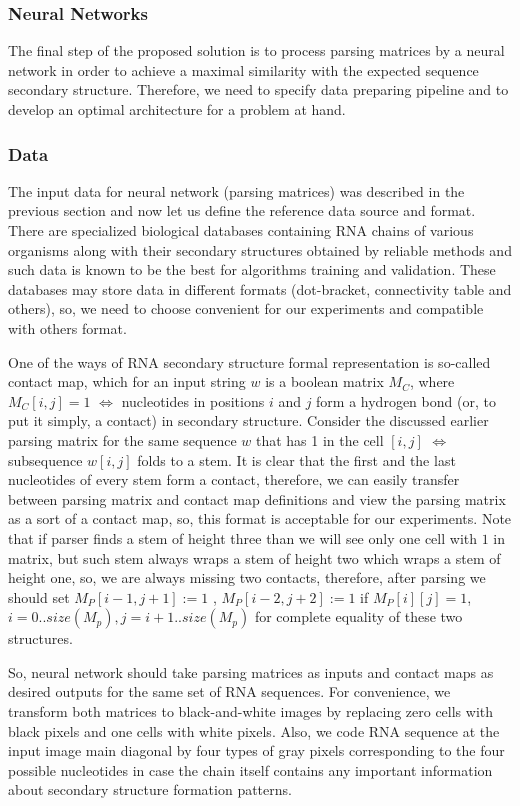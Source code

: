 \documentclass[runningheads]{llncs}
\begin{document}
\subsubsection{Neural Networks}
The final step of the proposed solution is to process parsing matrices by a neural network in order to achieve a maximal similarity with the expected sequence secondary structure. Therefore, we need to specify data preparing pipeline and to develop an optimal architecture for a problem at hand. 

\subsubsection{Data}
The input data for neural network (parsing matrices) was described in the previous section and now let us define the reference data source and format. There are specialized biological databases containing RNA chains of various organisms along with their secondary structures obtained by reliable methods and such data is known to be the best for algorithms training and validation. These databases may store data in  different formats (dot-bracket, connectivity table and others), so, we need to choose convenient for our experiments and compatible with others format.

One of the ways of RNA secondary structure formal representation is so-called contact map, which for an input string $w$ is a boolean matrix $M_C$, where $M_C [i,j] = 1$ $\iff$ nucleotides in positions $i$ and $j$ form a hydrogen bond (or, to put it simply, a contact) in secondary structure. Consider the discussed earlier parsing matrix for the same sequence $w$ that has 1 in the cell $[i, j]$ $\iff$ subsequence $w[i, j]$ folds to a stem. It is clear that the first and the last nucleotides of every stem form a contact, therefore, we can easily transfer between parsing matrix and contact map definitions and view the parsing matrix as a sort of a contact map, so, this format is acceptable for our experiments. Note that if parser finds a stem of height three than we will see only one cell with $1$ in matrix, but such stem always wraps a stem of height two which wraps a stem of height one, so, we are always missing two contacts, therefore, after parsing we should set $M_P[i - 1, j + 1] := 1$ , $M_P[i - 2, j + 2] := 1$ if $M_P[i][j] = 1$, $i = 0..size(M_p), j = i + 1..size(M_p)$ for complete equality of these two structures.

So, neural network should take parsing matrices as inputs and contact maps as desired outputs for the same set of RNA sequences. For convenience, we transform both matrices to black-and-white images by replacing zero cells with black pixels and one cells with white pixels. Also, we code RNA sequence at the input image main diagonal by four types of gray pixels corresponding to the four possible nucleotides in case the chain itself contains any important information about secondary structure formation patterns.
\end{document}
